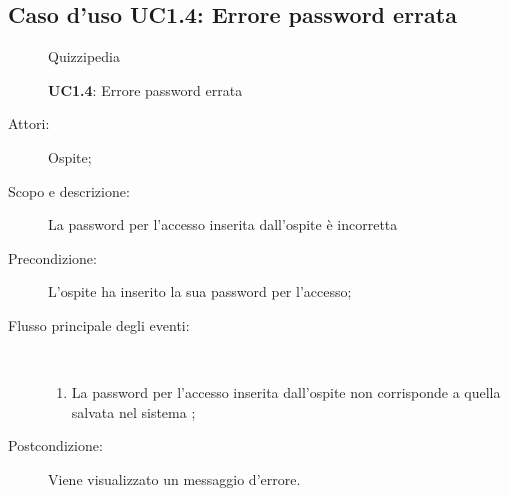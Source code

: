\subsection{Caso d'uso UC1.4: Errore password errata}
	\begin{figure}[H]
		\centering
		\begin{resizedtikzpicture}{\textwidth}
		\begin{umlsystem}[x=0, fill=lightgray!20]{Quizzipedia}
		\end{umlsystem}
		\end{resizedtikzpicture}
		\caption{\textbf{UC1.4}: Errore password errata}
		\label{UC1.4}
	\end{figure}
\begin{description}
\item[Attori:] Ospite;
\item[Scopo e descrizione:] La password per l'accesso inserita dall'ospite è incorretta
      \item[Precondizione:] L'ospite ha inserito la sua password per l'accesso;

        \item[Flusso principale degli eventi:] \ 
 \begin{enumerate}
          \item La password per l'accesso inserita dall'ospite non corrisponde a quella salvata nel sistema
;

      \end{enumerate}
    \item[Postcondizione:] Viene visualizzato un messaggio d'errore.
  \end{description}
\hypertarget{UC2}{}
